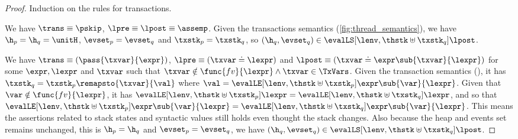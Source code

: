 \begin{proof}
Induction on the rules for transactions.


We have  \(\trans \equiv \pskip\), \( \lpre \equiv \lpost \equiv \assemp \).
Given the transactions semantics (\fig \ref{fig:thread_semantics}), we have \( \h_{p} = \h_{q} = \unitH \), \( \evset_{p} = \evset_{q} \) and \( \txstk_{p} = \txstk_{q} \), so \( (\h_{q},\evset_{q} ) \in \evalLS[\lenv, \thstk \uplus \txstk_{q}]{\lpost} \).


We have \(\trans \equiv ( \pass{\txvar}{\expr} ) \), \( \lpre \equiv ( \txvar \doteq \lexpr ) \) and \( \lpost \equiv ( \txvar \doteq \expr\sub{\txvar}{\lexpr} ) \) for some \( \expr, \lexpr \) and \( \txvar \) such that \( \txvar \notin \func{fv}{\lexpr} \land \txvar \in \TxVars\).
Given the transaction semantics (), it has \( \txstk_{q} = \txstk_{p}\remapsto{\txvar}{\val} \) where \( \val = \evalLE[\lenv, \thstk \uplus \txstk_{p}]{\expr\sub{\var}{\lexpr}} \).
Given that \( \var \notin \func{fv}{\lexpr} \), it has \( \evalLE[\lenv, \thstk \uplus \txstk_{p}]{\lexpr} = \evalLE[\lenv, \thstk \uplus \txstk_{q}]{\lexpr} \), and so that \( \evalLE[\lenv, \thstk \uplus \txstk_{p}]{\expr\sub{\var}{\lexpr}} = \evalLE[\lenv, \thstk \uplus \txstk_{q}]{\expr\sub{\var}{\lexpr}} \).
This means the assertions related to stack states and syntactic values still holds even thought the stack changes.
Also because the heap and events set remains unchanged, this is \( \h_{p} = \h_{q} \) and \( \evset_{p} = \evset_{q} \), we have \( (\h_{q}, \evset_{q} ) \in \evalLS[\lenv, \thstk \uplus \txstk_{q}]{\lpost} \).



\end{proof}
